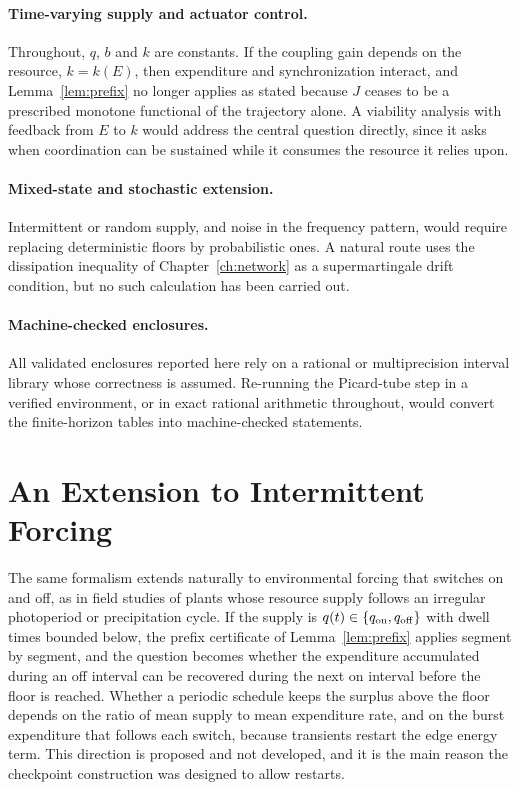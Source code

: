 \documentclass[11pt,notitlepage]{report}
\theoremstyle{definition}
\theoremstyle{remark}
\begin{document}
\paragraph{Time-varying supply and actuator control.} Throughout, $q$, $b$ and $k$ are constants. If the coupling gain depends on the resource, $k=k(E)$, then expenditure and synchronization interact, and Lemma~\ref{lem:prefix} no longer applies as stated because $J$ ceases to be a prescribed monotone functional of the trajectory alone. A viability analysis with feedback from $E$ to $k$ would address the central question directly, since it asks when coordination can be sustained while it consumes the resource it relies upon.

\paragraph{Mixed-state and stochastic extension.} Intermittent or random supply, and noise in the frequency pattern, would require replacing deterministic floors by probabilistic ones. A natural route uses the dissipation inequality of Chapter~\ref{ch:network} as a supermartingale drift condition, but no such calculation has been carried out.

\paragraph{Machine-checked enclosures.} All validated enclosures reported here rely on a rational or multiprecision interval library whose correctness is assumed. Re-running the Picard-tube step in a verified environment, or in exact rational arithmetic throughout, would convert the finite-horizon tables into machine-checked statements.

\section{An Extension to Intermittent Forcing}
The same formalism extends naturally to environmental forcing that switches on and off, as in field studies of plants whose resource supply follows an irregular photoperiod or precipitation cycle. If the supply is $q(t)\in\{q_{\rm on},q_{\rm off}\}$ with dwell times bounded below, the prefix certificate of Lemma~\ref{lem:prefix} applies segment by segment, and the question becomes whether the expenditure accumulated during an off interval can be recovered during the next on interval before the floor is reached. Whether a periodic schedule keeps the surplus above the floor depends on the ratio of mean supply to mean expenditure rate, and on the burst expenditure that follows each switch, because transients restart the edge energy term. This direction is proposed and not developed, and it is the main reason the checkpoint construction was designed to allow restarts.
\end{document}
